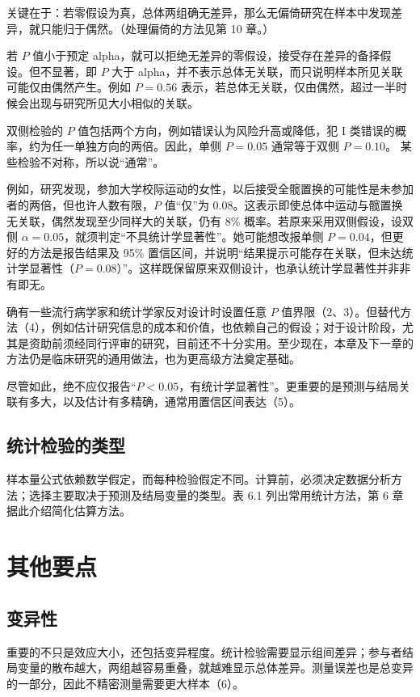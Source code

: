 关键在于：若零假设为真，总体两组确无差异，那么无偏倚研究在样本中发现差异，就只能归于偶然。（处理偏倚的方法见第 10 章。）

若 $P$ 值小于预定 alpha，就可以拒绝无差异的零假设，接受存在差异的备择假设。但不显著，即 $P$ 大于 alpha，并不表示总体无关联，而只说明样本所见关联可能仅由偶然产生。例如 $P=0.56$ 表示，若总体无关联，仅由偶然，超过一半时候会出现与研究所见大小相似的关联。

双侧检验的 $P$ 值包括两个方向，例如错误认为风险升高或降低，犯 I 类错误的概率，约为任一单独方向的两倍。因此，单侧 $P=0.05$ 通常等于双侧 $P=0.10$。
某些检验不对称，所以说“通常”。

例如，研究发现，参加大学校际运动的女性，以后接受全髋置换的可能性是未参加者的两倍，但也许人数有限，$P$ 值“仅”为 0.08。这表示即使总体中运动与髋置换无关联，偶然发现至少同样大的关联，仍有 8\% 概率。若原来采用双侧假设，设双侧 $\alpha=0.05$，就须判定“不具统计学显著性”。她可能想改报单侧 $P=0.04$，但更好的方法是报告结果及 95\% 置信区间，并说明“结果提示可能存在关联，但未达统计学显著性（$P=0.08$）”。这样既保留原来双侧设计，也承认统计学显著性并非非有即无。

确有一些流行病学家和统计学家反对设计时设置任意 $P$ 值界限（2、3）。但替代方法（4），例如估计研究信息的成本和价值，也依赖自己的假设；对于设计阶段，尤其是资助前须经同行评审的研究，目前还不十分实用。至少现在，本章及下一章的方法仍是临床研究的通用做法，也为更高级方法奠定基础。

尽管如此，绝不应仅报告“$P<0.05$，有统计学显著性”。更重要的是预测与结局关联有多大，以及估计有多精确，通常用置信区间表达（5）。

\subsection{统计检验的类型}
样本量公式依赖数学假定，而每种检验假定不同。计算前，必须决定数据分析方法；选择主要取决于预测及结局变量的类型。表 6.1 列出常用统计方法，第 6 章据此介绍简化估算方法。

\section{其他要点}
\subsection{变异性}
重要的不只是效应大小，还包括变异程度。统计检验需要显示组间差异；参与者结局变量的散布越大，两组越容易重叠，就越难显示总体差异。测量误差也是总变异的一部分，因此不精密测量需要更大样本（6）。

